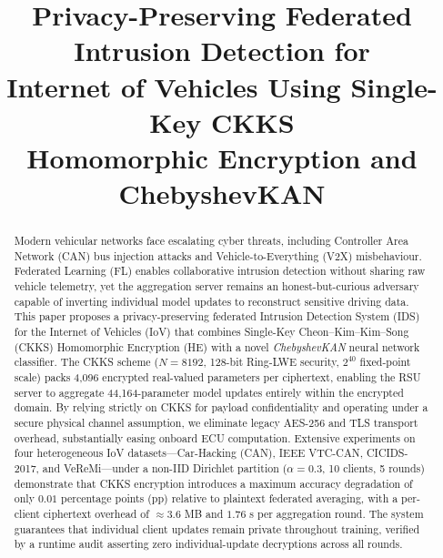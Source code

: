 \documentclass[conference]{IEEEtran}
\begin{document}
\title{Privacy-Preserving Federated Intrusion Detection for\\
Internet of Vehicles Using Single-Key CKKS\\
Homomorphic Encryption and ChebyshevKAN}



\maketitle

\begin{abstract}
Modern vehicular networks face escalating cyber threats, including
Controller Area Network (CAN) bus injection attacks and Vehicle-to-Everything
(V2X) misbehaviour. Federated Learning (FL) enables collaborative intrusion
detection without sharing raw vehicle telemetry, yet the aggregation server
remains an honest-but-curious adversary capable of inverting individual
model updates to reconstruct sensitive driving data. This paper proposes a
privacy-preserving federated Intrusion Detection System (IDS) for the Internet
of Vehicles (IoV) that combines Single-Key Cheon--Kim--Kim--Song (CKKS)
Homomorphic Encryption (HE) with a novel \emph{ChebyshevKAN} neural network
classifier. The CKKS scheme ($N{=}8192$, 128-bit Ring-LWE security, $2^{40}$
fixed-point scale) packs 4,096 encrypted real-valued parameters per ciphertext,
enabling the RSU server to aggregate 44,164-parameter model updates entirely
within the encrypted domain. By relying strictly on CKKS for payload confidentiality
and operating under a secure physical channel assumption, we eliminate legacy
AES-256 and TLS transport overhead, substantially easing onboard ECU computation.
Extensive experiments on four heterogeneous IoV datasets---Car-Hacking (CAN),
IEEE VTC-CAN, CICIDS-2017, and VeReMi---under a non-IID Dirichlet partition
($\alpha{=}0.3$, 10 clients, 5 rounds) demonstrate that CKKS encryption introduces
a maximum accuracy degradation of only $0.01$ percentage points (pp) relative
to plaintext federated averaging, with a per-client ciphertext overhead of
${\approx}3.6$ MB and $1.76$ s per aggregation round. The system guarantees that
individual client updates remain private throughout training, verified by a runtime
audit asserting zero individual-update decryptions across all rounds.
\end{abstract}
\end{document}
